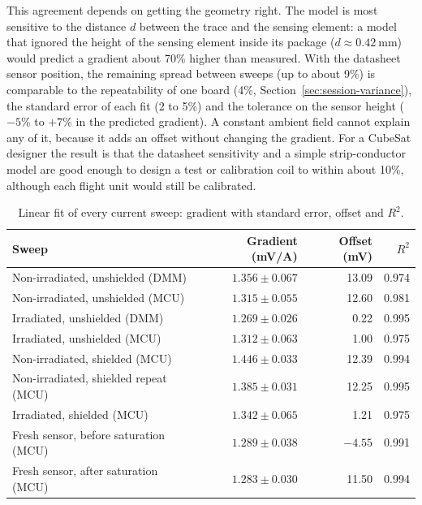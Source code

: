 \documentclass[12pt,a4paper]{article}
\begin{document}
This agreement depends on getting the geometry right. The model is most sensitive to the distance $d$ between the trace and the sensing element: a model that ignored the height of the sensing element inside its package ($d \approx \SI{0.42}{\milli\metre}$) would predict a gradient about 70\% higher than measured. With the datasheet sensor position, the remaining spread between sweeps (up to about 9\%) is comparable to the repeatability of one board (4\%, Section~\ref{sec:session-variance}), the standard error of each fit (2 to 5\%) and the tolerance on the sensor height ($-5\%$ to $+7\%$ in the predicted gradient). A constant ambient field cannot explain any of it, because it adds an offset without changing the gradient. For a CubeSat designer the result is that the datasheet sensitivity and a simple strip-conductor model are good enough to design a test or calibration coil to within about 10\%, although each flight unit would still be calibrated.

\begin{table}[H]
\centering
\caption{Linear fit of every current sweep: gradient with standard error, offset and $R^2$.}
\label{tab:all-fits}
\begin{tabular}{@{}lrrr@{}}
\toprule
Sweep & Gradient (mV/A) & Offset (mV) & $R^2$ \\
\midrule
Non-irradiated, unshielded (DMM) & $1.356 \pm 0.067$ & 13.09 & 0.974 \\
Non-irradiated, unshielded (MCU) & $1.315 \pm 0.055$ & 12.60 & 0.981 \\
Irradiated, unshielded (DMM) & $1.269 \pm 0.026$ & 0.22 & 0.995 \\
Irradiated, unshielded (MCU) & $1.312 \pm 0.063$ & 1.00 & 0.975 \\
Non-irradiated, shielded (MCU) & $1.446 \pm 0.033$ & 12.39 & 0.994 \\
Non-irradiated, shielded repeat (MCU) & $1.385 \pm 0.031$ & 12.25 & 0.995 \\
Irradiated, shielded (MCU) & $1.342 \pm 0.065$ & 1.21 & 0.975 \\
Fresh sensor, before saturation (MCU) & $1.289 \pm 0.038$ & $-4.55$ & 0.991 \\
Fresh sensor, after saturation (MCU) & $1.283 \pm 0.030$ & 11.50 & 0.994 \\
\bottomrule
\end{tabular}
\end{table}
\end{document}

